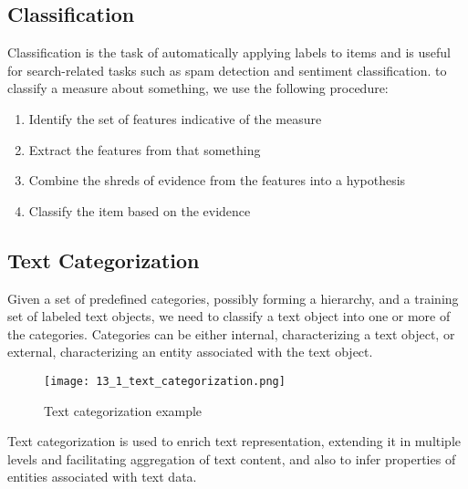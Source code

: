 \documentclass{article}
\begin{document}
\subsection{Classification}
Classification is the task of automatically applying labels to items and is useful for search-related tasks such as spam detection and sentiment classification. to classify a measure about something, we use the following procedure:
\begin{enumerate}
    \item Identify the set of features indicative of the measure
    \item Extract the features from that something
    \item Combine the shreds of evidence from the features into a hypothesis
    \item Classify the item based on the evidence
\end{enumerate}

\subsection{Text Categorization}
Given a set of predefined categories, possibly forming a hierarchy, and a training set of labeled text objects, we need to classify a text object into one or more of the categories. Categories can be either internal, characterizing a text object, or external, characterizing  an entity associated with the text object.
\begin{figure}[H]
    \centering
    \texttt{[image: 13\_1\_text\_categorization.png]}
    \caption{Text categorization example}
\end{figure}
Text categorization is used to enrich text representation, extending it in multiple levels and facilitating aggregation of text content, and also to infer properties of entities associated with text data.
\end{document}
